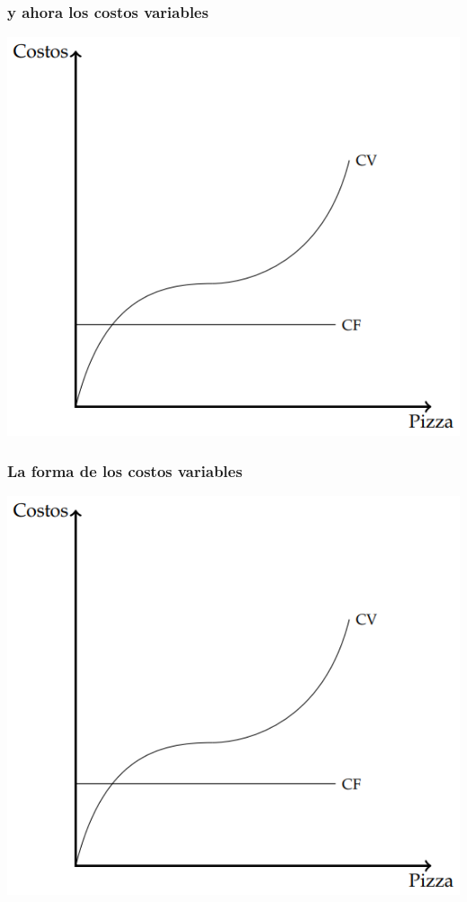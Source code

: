\documentclass{beamer}
\begin{document}
\begin{frame}
\frametitle{y ahora los costos variables}
\centering
\includegraphics[scale=0.6]{../Figures/C13.2.png}
\end{frame}

\begin{frame}
    \frametitle{La forma de los costos variables}
    \centering
    \includegraphics[scale=0.6]{../Figures/C13.2.png}
\end{frame}
\end{document}
